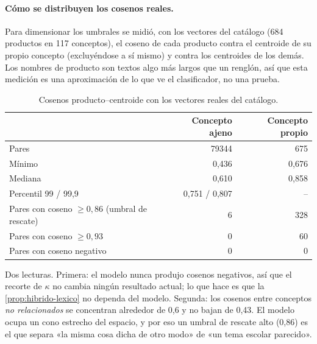 \paragraph{Cómo se distribuyen los cosenos reales.} Para dimensionar los
umbrales se midió, con los vectores del catálogo (684 productos en 117
conceptos), el coseno de cada producto contra el centroide de su propio
concepto (excluyéndose a sí mismo) y contra los centroides de los demás. Los
nombres de producto son textos algo más largos que un renglón, así que esta
medición es una aproximación de lo que ve el clasificador, no una prueba.

\begin{table}[htbp]
\centering\small
\caption{Cosenos producto--centroide con los vectores reales del catálogo.}
\label{tab:cosenos}
\begin{tabular}{@{}lrr@{}}
\toprule
& Concepto ajeno & Concepto propio \\
\midrule
Pares & \num{79344} & 675 \\
Mínimo & 0,436 & 0,676 \\
Mediana & 0,610 & 0,858 \\
Percentil 99 / 99,9 & 0,751 / 0,807 & -- \\
Pares con coseno $\geq0{,}86$ (umbral de rescate) & 6 & 328 \\
Pares con coseno $\geq0{,}93$ & 0 & 60 \\
Pares con coseno negativo & 0 & 0 \\
\bottomrule
\end{tabular}
\end{table}

Dos lecturas. Primera: el modelo nunca produjo cosenos negativos, así que el
recorte de $\kappa$ no cambia ningún resultado actual; lo que hace es que la
\cref{prop:hibrido-lexico} no dependa del modelo. Segunda: los cosenos entre
conceptos \emph{no relacionados} se concentran alrededor de 0,6 y no bajan de
0,43. El modelo ocupa un cono estrecho del espacio, y por eso un umbral de
rescate alto (0,86) es el que separa «la misma cosa dicha de otro modo» de
«un tema escolar parecido».

